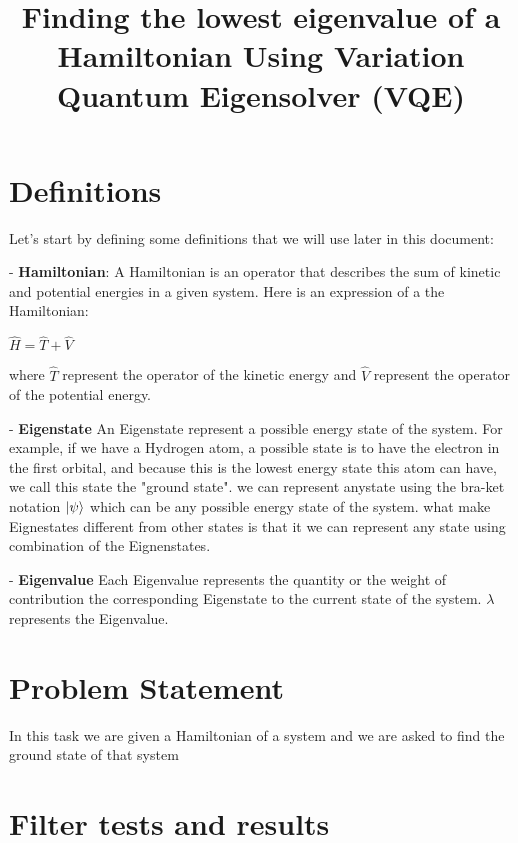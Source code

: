 \documentclass[11pt]{article}
\date{}
\title{\vspace{-1cm}Finding the lowest eigenvalue of a Hamiltonian Using Variation Quantum Eigensolver (VQE)}
\begin{document}
	
	\maketitle	
	
	\vspace{-3cm}
	\thispagestyle{fancy}
	
	
	\section*{Definitions}
	
	
	{\addtolength{\leftskip}{7mm}
		
		
	Let's start by defining some definitions that we will use later in this document:
	
	- \textbf{Hamiltonian}: 
	A Hamiltonian is an operator that describes the sum of kinetic and potential energies in a given system. Here is an expression of a the Hamiltonian: 
	
	$\displaystyle {\hat{H}}={\hat{T}}+{\hat{V}}$
	
	where $\hat{T}$ represent the operator of the kinetic energy and $\hat{V}$ represent the operator of the potential energy.
	
	
	- \textbf{Eigenstate}
	An Eigenstate represent a possible energy state of the system. For example, if we have a Hydrogen atom, a possible state is to have the electron in the first orbital, and because this is the lowest energy state this atom can have, we call this state the "ground state". we can represent anystate using the bra-ket notation $\ket{\psi}$ which can be any possible energy state of the system. what make Eignestates different from other states is that it we can represent any state using combination of the Eignenstates.
	
	
	- \textbf{Eigenvalue}
	Each Eigenvalue represents the quantity or the weight of contribution the corresponding Eigenstate to the current state of the system. $\lambda$ represents the Eigenvalue.

   	}
	
	
	\section*{Problem Statement}
	{\addtolength{\leftskip}{7mm}
		In this task we are given a Hamiltonian of a system and we are asked to find the ground state of that system
	}
	


	\section*{Filter tests and results}
	
\end{document}
